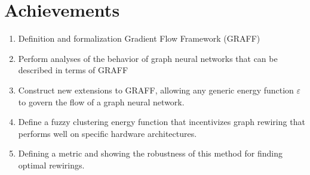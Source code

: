 \documentclass[../main.tex]{subfiles}
\begin{document}
    \section{Achievements}\label{sec:achievements}
    \begin{enumerate}
        \item Definition and formalization Gradient Flow Framework (GRAFF) 
        \item Perform analyses of the behavior of graph neural networks that can be described in terms of GRAFF 
        \item Construct new extensions to GRAFF, allowing any generic energy function $\varepsilon$ to govern the flow of a graph neural network.
        \item Define a fuzzy clustering energy function that incentivizes graph rewiring that performs well on specific hardware architectures.
        \item Defining a metric and showing the robustness of this method for finding optimal rewirings.
    \end{enumerate}
\end{document}

